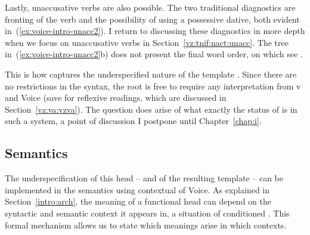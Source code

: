 \begin{exe}
\begin{xlist}
\begin{exe}
\begin{xlist}
\begin{exe}
\begin{xlist}
\begin{exe}
\begin{exe}
\begin{xlist}
\begin{exe}
\begin{xlist}
\begin{exe}
\begin{xlist}
\begin{exe}
\begin{xlist}
\begin{exe}
\begin{xlist}
\begin{exe}
\begin{xlist}
\begin{exe}
\begin{xlist}
\begin{exe}
\begin{xlist}
\begin{exe}
\begin{xlist}
\begin{exe}
\begin{xlist}
\begin{exe}
\begin{xlist}
\begin{exe}
\begin{xlist}
\begin{exe}
\begin{xlist}
\begin{exe}
\begin{exe}
\begin{xlist}
\begin{exe}
\begin{xlist}
\begin{exe}
\begin{xlist}
Lastly, unaccusative verbs are also possible. The two traditional diagnostics are fronting of the verb and the possibility of using a possessive dative, both evident in~(\ref{ex:voice-intro-unacc2}). I return to discussing these diagnostics in more depth when we focus on unaccusative verbs in Section~\ref{vz:tnif:nact:unacc}. The tree in~(\ref{ex:voice-intro-unacc2}b) does not present the final word order, on which see \cite{preminger10}.

 \begin{exe}
 \ex \label{ex:voice-intro-unacc2} 
 \begin{xlist} 
	
 	 \z
\z 		

This is how  captures the underspecified nature of the template {\tkal}. Since there are no restrictions in the syntax, the root is free to require any interpretation from v and Voice (save for reflexive readings, which are discussed in Section~\ref{vz:va:vzva}). The question does arise of what exactly the status of  is in such a system, a point of discussion I postpone until Chapter~\ref{chap:i}.

		
		\subsection{Semantics} \label{voice:voice:sem}
The underspecification of this head -- and of the resulting template -- can be implemented in the semantics using contextual  of Voice. As explained in Section~\ref{intro:arch}, the meaning of a functional head can depend on the syntactic and semantic context it appears in, a situation of conditioned . This formal mechanism allows us to state which meanings arise in which contexts.


\end{xlist}
\end{exe}
\end{xlist}
\end{exe}
\end{xlist}
\end{exe}
\end{xlist}
\end{exe}
\end{exe}
\end{xlist}
\end{exe}
\end{xlist}
\end{exe}
\end{xlist}
\end{exe}
\end{xlist}
\end{exe}
\end{xlist}
\end{exe}
\end{xlist}
\end{exe}
\end{xlist}
\end{exe}
\end{xlist}
\end{exe}
\end{xlist}
\end{exe}
\end{xlist}
\end{exe}
\end{xlist}
\end{exe}
\end{xlist}
\end{exe}
\end{xlist}
\end{exe}
\end{exe}
\end{xlist}
\end{exe}
\end{xlist}
\end{exe}
\end{xlist}
\end{exe}
